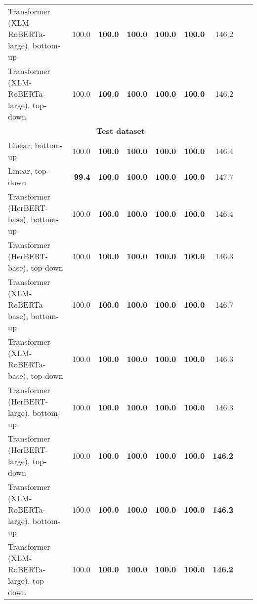 \begin{table}[ht!]
{\begin{tabular}{lrrrrrrrr}
  Transformer (XLM-RoBERTa-large), bottom-up & 100.0 & \textbf{100.0} & \textbf{100.0} & \textbf{100.0} & \textbf{100.0} & 146.2 \\ 
  Transformer (XLM-RoBERTa-large), top-down & 100.0 & \textbf{100.0} & \textbf{100.0} & \textbf{100.0} & \textbf{100.0} & 146.2 \\ 
   \hline \multicolumn{7}{c}{\textbf{Test dataset}} \\ \hline
Linear, bottom-up & 100.0 & \textbf{100.0} & \textbf{100.0} & \textbf{100.0} & \textbf{100.0} & 146.4 \\ 
  Linear, top-down & \textbf{99.4} & \textbf{100.0} & \textbf{100.0} & \textbf{100.0} & \textbf{100.0} & 147.7 \\ 
  Transformer (HerBERT-base), bottom-up & 100.0 & \textbf{100.0} & \textbf{100.0} & \textbf{100.0} & \textbf{100.0} & 146.4 \\ 
  Transformer (HerBERT-base), top-down & 100.0 & \textbf{100.0} & \textbf{100.0} & \textbf{100.0} & \textbf{100.0} & 146.3 \\ 
  Transformer (XLM-RoBERTa-base), bottom-up & 100.0 & \textbf{100.0} & \textbf{100.0} & \textbf{100.0} & \textbf{100.0} & 146.7 \\ 
  Transformer (XLM-RoBERTa-base), top-down & 100.0 & \textbf{100.0} & \textbf{100.0} & \textbf{100.0} & \textbf{100.0} & 146.3 \\ 
  Transformer (HerBERT-large), bottom-up & 100.0 & \textbf{100.0} & \textbf{100.0} & \textbf{100.0} & \textbf{100.0} & 146.3 \\ 
  Transformer (HerBERT-large), top-down & 100.0 & \textbf{100.0} & \textbf{100.0} & \textbf{100.0} & \textbf{100.0} & \textbf{146.2} \\ 
  Transformer (XLM-RoBERTa-large), bottom-up & 100.0 & \textbf{100.0} & \textbf{100.0} & \textbf{100.0} & \textbf{100.0} & \textbf{146.2} \\ 
  Transformer (XLM-RoBERTa-large), top-down & 100.0 & \textbf{100.0} & \textbf{100.0} & \textbf{100.0} & \textbf{100.0} & \textbf{146.2} \\ 
   \hline
\end{tabular}
}
\end{table}




